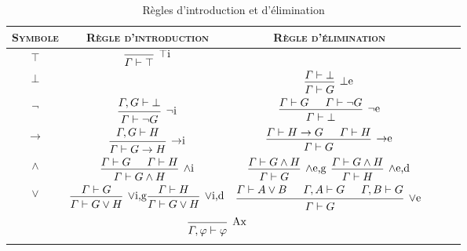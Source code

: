 \begin{table}[H]
	\centering
	\begin{tabular}{Sc|Sc|Sc}
		\hline
		\textsc{Symbole} & \textsc{Règle d'introduction} & \textsc{Règle d'élimination}\\ \hline \hline 
		$\top$\/&$\ptree{\infer0[$\top$i]{\Gamma \vdash \top}}$&\\ \hline
		$\bot$\/ &&$\ptree{\hypo{\Gamma\vdash\bot}\infer1[$\bot$e]{\Gamma \vdash G}}$\\ \hline
		$\lnot$\/ &$\ptree{\hypo{\Gamma,G\vdash \bot}\infer1[$\lnot$i]{\Gamma\vdash\lnot G}}$&$\ptree{\hypo{\Gamma\vdash G}\hypo{\Gamma\vdash \lnot G}\infer2[$\lnot$e]{\Gamma\vdash \bot}}$ \\ \hline
		$\to$ & $\ptree{\hypo{\Gamma,G \vdash H}\infer1[$\to$i]{\Gamma \vdash G \to H}}$ & $\ptree{\hypo{\Gamma \vdash H \to G}\hypo{\Gamma \vdash H}\infer2[$\to$e]{\Gamma \vdash G}}$\\ \hline
		$\land$\/ & $\ptree{\hypo{\Gamma \vdash G}\hypo{\Gamma \vdash H}\infer2[$\land$i]{\Gamma \vdash G \land H}}$\/ & $\ptree{\hypo{\Gamma \vdash G \land H}\infer1[$\land$e,g]{\Gamma \vdash G}}$ \quad\quad $\ptree{\hypo{\Gamma \vdash G \land H}\infer1[$\land$e,d]{\Gamma \vdash H}}$ \\ \hline
		$\lor$&$\ptree{\hypo{\Gamma\vdash G}\infer1[$\lor$i,g]{\Gamma\vdash G \lor H}}$\quad\quad$\ptree{\hypo{\Gamma\vdash H}\infer1[$\lor$i,d]{\Gamma\vdash G \lor H}}$&$\ptree{\hypo{\Gamma \vdash A \lor B}\hypo{\Gamma,A\vdash G}\hypo{\Gamma,B\vdash G}\infer3[$\lor$e]{\Gamma \vdash G}}$\\ \hline
		\multicolumn{3}{c}{}\\
		\multicolumn{3}{c}{$\ptree{\infer 0[Ax]{\Gamma, \varphi\vdash \varphi}}$}\\
		\\ \hline
	\end{tabular}
	\caption{Règles d'introduction et d'élimination}
\end{table}
